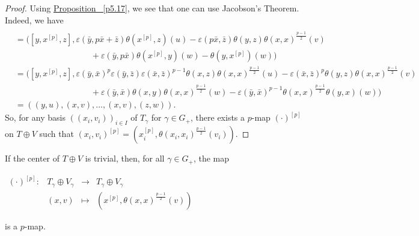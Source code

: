 \documentclass[11pt, twoside]{article}
\begin{document}
\begin{proof}
    Using \hyperref[p5.17]{Proposition ~\ref*{p5.17}}, we see that one can use Jacobson's Theorem. Indeed, we have \begin{align*}
        [(y&,u),(x^{[p]},\theta(x,x)^{\frac{p-1}{2}}(v)),(z,w)] \\ &= ([y,x^{[p]},z], \varepsilon(\bar{y},p\bar{x}+\bar{z})\theta(x^{[p]},z)(u) - \varepsilon(p\bar{x},\bar{z})\theta(y,z)\theta(x,x)^{\frac{p-1}{2}}(v)\\& \quad\quad\quad\quad\quad\quad\quad\quad\quad + \varepsilon(\bar{y},p\bar{x})\theta(x^{[p]},y)(w) - \theta(y,x^{[p]})(w)) \\ & = ([y,x^{[p]},z], \varepsilon(\bar{y},\bar{x})^p\varepsilon(\bar{y},\bar{z})\varepsilon(\bar{x},\bar{z})^{p-1}\theta(x,z)\theta(x,x)^{\frac{p-1}{2}}(u) - \varepsilon(\bar{x},\bar{z})^p\theta(y,z)\theta(x,x)^{\frac{p-1}{2}}(v) \\ &\quad\quad\quad\quad\quad\quad\quad\quad\quad + \varepsilon(\bar{y},\bar{x})\theta(x,y)\theta(x,x)^{\frac{p-1}{2}}(w) - \varepsilon(\bar{y},\bar{x})^{p-1}\theta(x,x)^{\frac{p-1}{2}}\theta(y,x)(w)) \\ & = ((y,u),(x,v),\dots,(x,v),(z,w)).
    \end{align*} So, for any basis $((x_i,v_i))_{i\in I} $ of $T_\gamma $ for $\gamma\in G_+ $, there exists a $p$-map $(\cdot)^{[p]}$ on $T\oplus V $ such that $(x_i,v_i)^{[p]}= (x_i^{[p]},\theta(x_i,x_i)^{\frac{p-1}{2}}(v_i)) $.
\end{proof}

\begin{rmq}
    If the center of $T\oplus V $ is trivial, then, for all $\gamma\in G_+ $, the map \begin{center}
    $\begin{array}{lrcl}
(\cdot)^{[p]} : & T_\gamma\oplus V_\gamma & \longrightarrow & T_\gamma\oplus V_\gamma \\
    & (x,v) & \longmapsto & (x^{[p]},\theta(x,x)^{\frac{p-1}{2}}(v))\end{array}$ \end{center} is a $p$-map.
\end{rmq}
\end{document}
